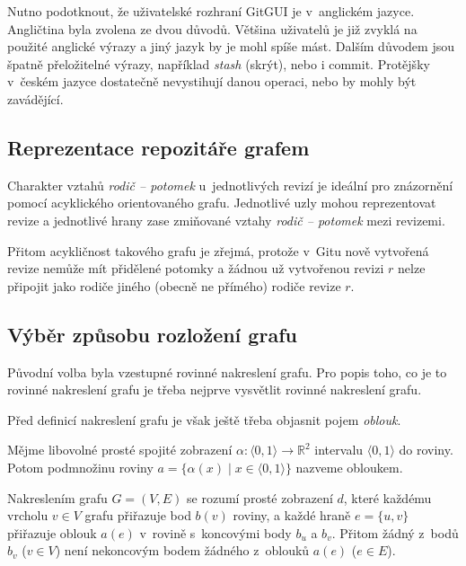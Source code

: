 \documentclass[
  biblatex,
  glossaries,
  index
]{kidiplom}
\begin{document}
Nutno podotknout, že uživatelské rozhraní GitGUI je v~anglickém jazyce. Angličtina byla zvolena ze dvou důvodů. Většina uživatelů je již zvyklá na použité anglické výrazy a jiný jazyk by je mohl spíše mást. Dalším důvodem jsou špatně přeložitelné výrazy, například \textit{stash} (skrýt), nebo i commit. Protějšky v~českém jazyce dostatečně nevystihují danou operaci, nebo by mohly být zavádějící.

\subsection{Reprezentace repozitáře grafem}
Charakter vztahů {\it rodič -- potomek} u~jednotlivých revizí je ideální pro znázornění pomocí acyklického orientovaného grafu. Jednotlivé uzly mohou reprezentovat revize a jednotlivé hrany zase zmiňované vztahy {\it rodič -- potomek} mezi revizemi.

Přitom acykličnost takového grafu je zřejmá, protože v~Gitu nově vytvořená revize nemůže mít přidělené potomky a žádnou už vytvořenou revizi $r$ nelze připojit jako rodiče jiného (obecně ne přímého) rodiče revize $r$.

\subsection{Výběr způsobu rozložení grafu}

Původní volba byla vzestupné rovinné nakreslení grafu. Pro popis toho, co je to rovinné nakreslení grafu je třeba nejprve vysvětlit rovinné nakreslení grafu.

Před definicí nakreslení grafu je však ještě třeba objasnit pojem {\it oblouk}.

\begin{definition}
Mějme libovolné prosté spojité zobrazení $\alpha\colon\langle 0,1\rangle\to\mathbb{R}^2$ intervalu $\langle 0,1\rangle$ do roviny. Potom podmnožinu roviny $a=\{\alpha(x)\mid x\in\langle 0,1\rangle\}$ nazveme obloukem.
\end{definition}

\begin{definition}
Nakreslením grafu $G=(V,E)$ se rozumí prosté zobrazení $d$, které každému vrcholu $v\in V$ grafu přiřazuje bod $b(v)$ roviny, a každé hraně $e=\{u,v\}$ přiřazuje oblouk $a(e)$ v~rovině s~koncovými body $b_u$ a $b_v$. Přitom žádný z~bodů $b_v$ ($v\in V$) není
nekoncovým bodem žádného z~oblouků $a(e)$ ($e\in E$).
\end{definition}
\end{document}
